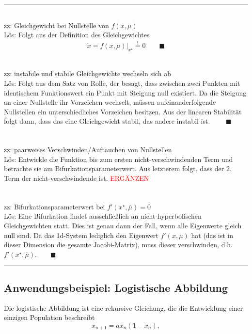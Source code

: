 \documentclass{article}
\begin{document}
{\color{violet}
\hrule
	\\
	zz: Gleichgewicht bei Nullstelle von $f(x, \mu)$\\
	Lös: Folgt aus der Definition des Gleichgewichtes
		\begin{align*}
			\dot{x} = \left. f(x,\mu) \right|_{x^\star} \stackrel{!}{=} 0 \qquad \blacksquare
		\end{align*}
	
	
	\\
	zz: instabile und stabile Gleichgewichte wechseln sich ab\\
	Lös:	 Folgt aus dem Satz von Rolle, der besagt, dass zwischen zwei Punkten mit identischem Funktionswert ein Punkt mit Steigung null existiert. Da die Steigung an einer Nullstelle ihr Vorzeichen wechselt, müssen aufeinanderfolgende Nullstellen ein unterschiedliches Vorzeichen besitzen. Aus der linearen Stabilität folgt dann, dass das eine Gleichgewicht stabil, das andere instabil ist. $\qquad \blacksquare$\\
	\\
	\\
	zz: paarweises Verschwinden/Auftauchen von Nullstellen\\
	Lös: Entwickle die Funktion bis zum ersten nicht-verschwindenden Term und betrachte sie am Bifurkationsparameterwert. Aus letzterem folgt, dass der 2. Term der nicht-verschwindende ist. \textcolor{red}{ERGÄNZEN}\\
\\
	\\
	zz: Bifurkationsparameterwert bei $f'(x^\star,\bar{\mu}) = 0$\\
	Lös: Eine Bifurkation findet ausschließlich an nicht-hyperbolischen Gleichgewichten statt. Dies ist genau dann der Fall, wenn alle Eigenwerte gleich null sind. Da das 1d-System lediglich den Eigenwert $f'(x,\mu)$ hat (das ist in dieser Dimension die gesamte Jacobi-Matrix), muss dieser verschwinden, d.h. $f'(x^\star,\bar{\mu}). \qquad \blacksquare$
\hrule
}


\newpage


\subsection{Anwendungsbeispiel: Logistische Abbildung}
Die logistische Abbildung ist eine rekursive Gleichung, die die Entwicklung einer einzigen Population beschreibt
	\begin{equation}
		x_{n+1} = a x_n(1 - x_n),
	\end{equation}
\end{document}
